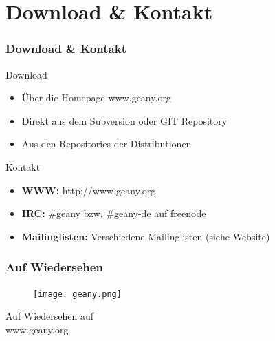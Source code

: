 \documentclass[compress]{beamer}
\begin{document}
\section{Download \& Kontakt}
\begin{frame}
	\frametitle{Download \& Kontakt}
	\begin{block}{Download}
		\begin{itemize}
			\item Über die Homepage www.geany.org
			\item Direkt aus dem Subversion oder GIT Repository
			\item Aus den Repositories der Distributionen
		\end{itemize}
	\end{block}
	\begin{block}{Kontakt}
		\begin{itemize}
			\item \textbf{WWW:} http://www.geany.org
			\item \textbf{IRC:} \#geany bzw. \#geany-de auf freenode
			\item \textbf{Mailinglisten:} Verschiedene Mailinglisten (siehe Website)
		\end{itemize}
	\end{block}
\end{frame}


\begin{frame}[plain]
	\frametitle{Auf Wiedersehen}
	\begin{figure}[ht]
		\texttt{[image: geany.png]}
	\end{figure}

	\begin{center}
	\huge Auf Wiedersehen auf \\ www.geany.org
	\end{center}
\end{frame}
\end{document}
